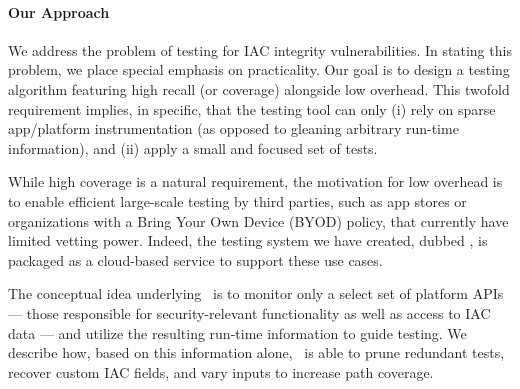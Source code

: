 %

\paragraph{Our Approach} We address the problem of testing for IAC integrity vulnerabilities. In stating this problem, we place special emphasis on practicality. Our goal is to design a testing algorithm featuring high recall (or coverage) alongside low overhead. This twofold requirement implies, in specific, that the testing tool can only (i) rely on sparse app/platform instrumentation (as opposed to gleaning arbitrary run-time information), and (ii) apply a small and focused set of tests.

While high coverage is a natural requirement, the motivation for low overhead is to enable efficient large-scale testing by third parties, such as app stores or organizations with a Bring Your Own Device (BYOD) policy, that currently have limited vetting power. Indeed, the testing system we have created, dubbed \Tool, is packaged as a cloud-based service to support these use cases.

The conceptual idea underlying \Tool\ is to monitor only a select set of platform APIs --- those responsible for security-relevant functionality as well as access to IAC data --- and utilize the resulting run-time information to guide testing. We describe how, based on this information alone, \Tool\ is able to prune redundant tests, recover custom IAC fields, and vary inputs to increase path coverage.  

